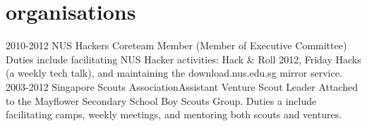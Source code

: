 \documentclass[]{friggeri-cv}
\begin{document}
\section{organisations}

\begin{entrylist}
	\entry
	{2010-2012}
	{NUS Hackers}
	{Coreteam Member (Member of Executive Committee)}
	{
		Duties include facilitating NUS Hacker activities: Hack \& Roll 2012, 
		Friday Hacks (a weekly tech talk), and maintaining the 
		download.nus.edu.sg mirror service.
	}
	\entry
	{2003-2012}
	{Singapore Scouts Association}{Assistant Venture Scout Leader}
	{
		Attached to the Mayflower Secondary School Boy Scouts Group. Duties a	
		include facilitating camps, weekly meetings, and mentoring both scouts 
		and ventures.
	}
\end{entrylist}
\end{document}
